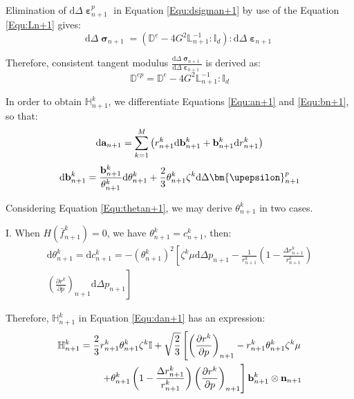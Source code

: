 Elimination of ${\text{d}}\Delta {\bm{\upepsilon }}_{n + 1}^p$ in Equation \ref{Equ:dsigman+1} by use of the Equation \ref{Equ:Ln+1} gives:
\begin{equation}
{\text{d}}\Delta {{\bm{\upsigma }}_{n + 1}} = \left( {{\mathbb{D}^e} - 4{G^2}\mathbb{L}_{n + 1}^{ - 1}:{\mathbb{I}_d}} \right):{\text{d}}\Delta {{\bm{\upepsilon }}_{n + 1}}
\end{equation}

Therefore, consistent tangent modulus $\frac{{{\text{d}}\Delta {{\bm{\upsigma }}_{n + 1}}}}{{{\text{d}}\Delta {{\bm{\upepsilon }}_{n + 1}}}}$ is derived as:
\begin{equation}
{\mathbb{D}^{ep}} = {\mathbb{D}^e} - 4{G^2}\mathbb{L}_{n + 1}^{ - 1}:{\mathbb{I}_d}
\end{equation}

In order to obtain $\mathbb{H}_{n + 1}^k$, we differentiate Equations \ref{Equ:an+1} and \ref{Equ:bn+1}, so that:
\begin{equation}
{\text{d}}{{\bf{a}}_{n + 1}} = \sum\limits_{k = 1}^M {\left( {r_{n + 1}^k{\text{d}}{\bf{b}}_{n + 1}^k + {\bf{b}}_{n + 1}^k{\text{d}}r_{n + 1}^k} \right)}
\end{equation}
\begin{equation}
\label{Equ:dbn+1}
{\text{d}}{\bf{b}}_{n + 1}^k = \frac{{{\bf{b}}_{n + 1}^k}}{{\theta _{n + 1}^k}}{\text{d}}\theta _{n + 1}^k + \frac{2}{3}\theta _{n + 1}^k{\zeta ^k}{\text{d}}\Delta {\bm{\upepsilon }}_{n + 1}^p
\end{equation}

Considering Equation \ref{Equ:thetan+1}, we may derive $\theta _{n + 1}^k$ in two cases.

I. When $H\left( {\bar f_{n + 1}^k} \right) = 0$, we have $\theta _{n + 1}^k = c_{n + 1}^k$, then:
\begin{equation}
\begin{aligned}
{\text{d}}\theta _{n + 1}^k = {\text{d}}c_{n + 1}^k =  - {\left( {\theta _{n + 1}^k} \right)^2} \left[ {\zeta ^k}\mu {\text{d}}\Delta {p_{n + 1}} - \frac{1}{{r_{n + 1}^k}}\left( {1 - \frac{{\Delta r_{n + 1}^k}}{{r_{n + 1}^k}}} \right)\right.\\
\left.{{\left( {\frac{{\partial {r^k}}}{{\partial p}}} \right)}_{n + 1}}{\text{d}}\Delta {p_{n + 1}} \right]
\end{aligned}
\end{equation}

Therefore, $\mathbb{H}_{n + 1}^k$ in Equation \ref{Equ:dan+1} has an expression:
\begin{equation}
\begin{aligned}
\mathbb{H}_{n + 1}^k = \frac{2}{3}r_{n + 1}^k\theta _{n + 1}^k{\zeta ^k}\mathbb{I} + \sqrt {\frac{2}{3}} \left[ {{\left( {\frac{{\partial {r^k}}}{{\partial p}}} \right)}_{n + 1}} - r_{n + 1}^k\theta _{n + 1}^k{\zeta ^k}\mu \right.\\
\left. + \theta _{n + 1}^k\left( {1 - \frac{{\Delta r_{n + 1}^k}}{{r_{n + 1}^k}}} \right){{\left( {\frac{{\partial {r^k}}}{{\partial p}}} \right)}_{n + 1}} \right]{\bf{b}}_{n + 1}^k \otimes {{\bf{n}}_{n + 1}}
\end{aligned}
\end{equation}

